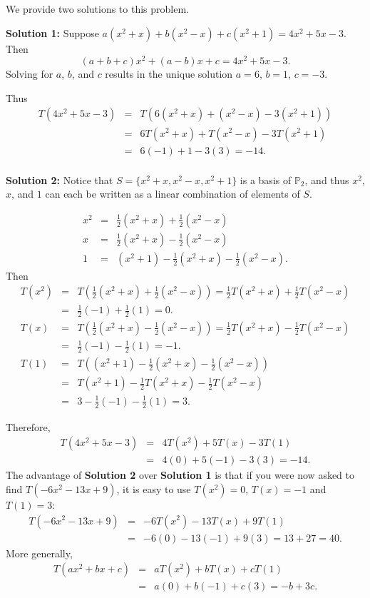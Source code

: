 \begin{solution}
We provide two solutions to this problem.

\textbf{Solution 1:}
Suppose
$a(x^2+x) + b(x^2-x) + c(x^2+1) = 4x^2+5x-3$. 
Then
\[ (a+b+c)x^2 + (a-b)x + c = 4x^2+5x-3.\]
Solving for $a$, $b$, and $c$ results in the unique solution
$a=6$, $b=1$, $c=-3$.

Thus
\begin{eqnarray*}
T(4x^2+5x-3) & = & T\left( 6(x^2+x) + (x^2-x) -3(x^2+1) \right) \\
& = & 6T(x^2+x) + T(x^2-x) -3T(x^2+1) \\
& = & 6(-1) + 1 -3(3) = -14. \\
\end{eqnarray*}

\textbf{Solution 2:}
Notice that
$S=\{ x^2+x, x^2-x, x^2+1\}$ is a basis of $\mathbb{ P}_2$, and
thus $x^2$, $x$, and $1$ can each be written as a linear 
combination of elements of $S$.

\begin{eqnarray*}
x^2 & = & \textstyle \frac{1}{2}(x^2+x) + \frac{1}{2}(x^2-x) \\
x & = & \textstyle \frac{1}{2}(x^2+x) - \frac{1}{2}(x^2-x) \\
1 & = & (x^2+1)-\textstyle \frac{1}{2}(x^2+x) - \frac{1}{2}(x^2-x).
\end{eqnarray*}
Then
\begin{eqnarray*}
T(x^2) & = & \textstyle T\left(\frac{1}{2}(x^2+x) + \frac{1}{2}(x^2-x)\right)
=\frac{1}{2}T(x^2+x) + \frac{1}{2}T(x^2-x)\\
& = & \textstyle \frac{1}{2}(-1) + \frac{1}{2}(1) = 0.  \\
T(x) & = & \textstyle T\left(\frac{1}{2}(x^2+x) - \frac{1}{2}(x^2-x)\right)
= \frac{1}{2}T(x^2+x) - \frac{1}{2}T(x^2-x) \\
& = & \textstyle \frac{1}{2}(-1) - \frac{1}{2}(1) = -1.\\
T(1) & = & \textstyle T\left((x^2+1)-\frac{1}{2}(x^2+x) -
\frac{1}{2}(x^2-x)\right)\\
& = & \textstyle T(x^2+1)-\frac{1}{2}T(x^2+x) - \frac{1}{2}T(x^2-x) \\
& = & \textstyle 3-\frac{1}{2}(-1) - \frac{1}{2}(1) = 3.
\end{eqnarray*}

Therefore,
\begin{eqnarray*}
T(4x^2+5x-3) & = & 4T(x^2) + 5T(x) -3T(1) \\
& = & 4(0) + 5(-1) - 3(3)=-14.
\end{eqnarray*}
The advantage of \textbf{Solution 2} over \textbf{Solution 1} is that 
if you were now asked to find $T(-6x^2-13x+9)$, it is easy to
use $T(x^2)=0$, $T(x)=-1$ and $T(1)= 3$:
\begin{eqnarray*}
T(-6x^2-13x+9) & = & -6T(x^2)-13T(x)+9T(1) \\
& = & -6(0)-13(-1)+9(3)=13+27=40.
\end{eqnarray*}
More generally, 
\begin{eqnarray*}
T(ax^2+bx+c) & = & aT(x^2)+bT(x)+cT(1) \\
& = & a(0)+b(-1)+c(3)=-b+3c.
\end{eqnarray*}
\end{solution}

